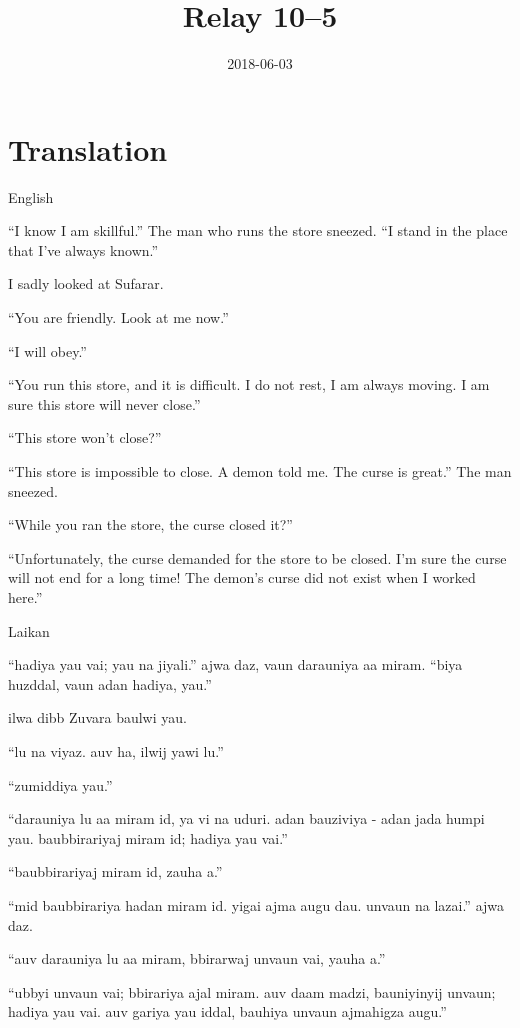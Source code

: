 \documentclass[11pt,a4paper]{article}
\date{2018-06-03}
\title{Relay 10–5}
\begin{document}
\tableofcontents


\section{Translation}
\label{sec:orgf879ac1}
\begin{short-relay}


\begin{natlang-name}
English
\end{natlang-name}

\begin{natlang-text}
``I know I am skillful.'' The man who runs the store sneezed. ``I stand in the
place that I've always known.''

I sadly looked at Sufarar.

``You are friendly. Look at me now.''

``I will obey.''

``You run this store, and it is difficult. I do not rest, I am always moving. I
am sure this store will never close.''

``This store won't close?''

``This store is impossible to close. A demon told me. The curse is great.'' The
man sneezed.

``While you ran the store, the curse closed it?''

``Unfortunately, the curse demanded for the store to be closed. I'm sure the
curse will not end for a long time! The demon's curse did not exist when I
worked here.''
\end{natlang-text}

\begin{conlang-name}
Laikan
\end{conlang-name}

\begin{conlang-text}
``hadiya yau vai; yau na jiyali.'' ajwa daz, vaun darauniya aa miram. ``biya
huzddal, vaun adan hadiya, yau.''

ilwa dibb Zuvara baulwi yau.

``lu na viyaz. auv ha, ilwij yawi lu.''

``zumiddiya yau.''

``darauniya lu aa miram id, ya vi na uduri. adan bauziviya - adan jada humpi
yau. baubbirariyaj miram id; hadiya yau vai.''

``baubbirariyaj miram id, zauha a.''

``mid baubbirariya hadan miram id. yigai ajma augu dau. unvaun na lazai.'' ajwa
 daz.

``auv darauniya lu aa miram, bbirarwaj unvaun vai, yauha a.''

``ubbyi unvaun vai; bbirariya ajal miram. auv daam madzi, bauniyinyij unvaun;
 hadiya yau vai. auv gariya yau iddal, bauhiya unvaun ajmahigza augu.''
\end{conlang-text}
\end{short-relay}
\end{document}
